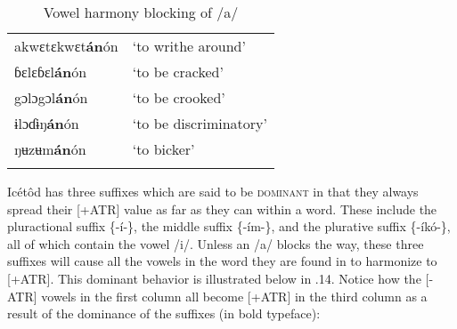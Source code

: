 \begin{table}
\caption{Vowel harmony blocking of /a/}
\label{tab:13}


\begin{tabularx}{\textwidth}{XX}
\lsptoprule

akwɛtɛkwɛt\textbf{án}ón & ‘to writhe around’\\
ɓɛlɛɓɛl\textbf{án}ón & ‘to be cracked’\\
gɔlɔgɔl\textbf{án}ón & ‘to be crooked’\\
ɨlɔɗɨŋ\textbf{án}ón & ‘to be discriminatory’\\
ŋʉzʉm\textbf{án}ón & ‘to bicker’\\
\lspbottomrule
\end{tabularx}
\end{table}
Icétôd has three suffixes which are said to be \textsc{dominant} in that they always spread their [+ATR] value as far as they can within a word. These include the pluractional suffix \{-í-\}, the middle suffix \{-ím-\}, and the plurative suffix \{-íkó-\}, all of which contain the vowel /i/. Unless an /a/ blocks the way, these three suffixes will cause all the vowels in the word they are found in to harmonize to [+ATR]. This dominant behavior is illustrated below in .14. Notice how the [-ATR] vowels in the first column all become [+ATR] in the third column as a result of the dominance of the suffixes (in bold typeface):


